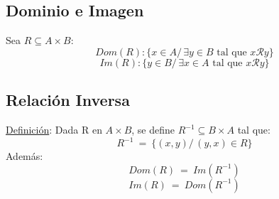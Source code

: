 \documentclass{article}
\newcommand{\tq}{/\,}                                   %
\newcommand{\eq}{\:=\:}                                 %
\begin{document}
\subsection{Dominio e Imagen}
Sea $R \subseteq A \times B$:
\begin{equation*}
    Dom(R):\{x \in A \tq \exists y \in B \text{ tal que } x\mathcal{R}y\}
\end{equation*}
\begin{equation*}
    Im(R):\{y \in B \tq \exists x \in A \text{ tal que } x\mathcal{R}y\}
\end{equation*}

\subsection{Relación Inversa}
\underline{Definición}: Dada R en $A \times B$, se define $R^{-1} \subseteq B \times A$ tal que:
\begin{equation*}
    R^{-1} \eq \{ (x,y) \tq (y,x) \in R \}
\end{equation*}
Además:
\begin{equation*}
    Dom(R) \eq Im(R^{-1})
\end{equation*}
\begin{equation*}
    Im(R) \eq Dom(R^{-1})
\end{equation*}
\end{document}
